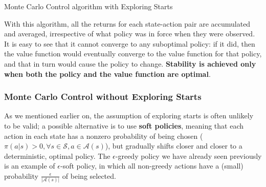 \begin{algorithm}[H]
\SetAlgoLined
{}

 \caption{Monte Carlo Control algorithm with Exploring Starts}
\end{algorithm}

With this algorithm, all the returns for each state-action pair are accumulated and averaged, irrespective of what policy was in force when they were observed. It is easy to see that it cannot converge to any suboptimal policy: if it did, then the value function would eventually converge to the value function for that policy, and that in turn would cause the policy to change. \textbf{Stability is achieved only when both the policy and the value function are optimal}.

\subsubsection{Monte Carlo Control without Exploring Starts}
As we mentioned earlier on, the assumption of exploring starts is often unlikely to be valid; a possible alternative is to use \textbf{soft policies}, meaning that each action in each state has a nonzero probability of being chosen ($\pi(a \vert s) > 0, \forall s\in\mathcal{S},a\in\mathcal{A}(s)$), but gradually shifts closer and closer to a deterministic, optimal policy. The $\epsilon$-greedy policy we have already seen previously is an example of $\epsilon$-soft policy, in which all non-greedy actions have a (small) probability $\frac{\epsilon}{\left\vert \mathcal{A}(s) \right\vert}$ of being selected.

